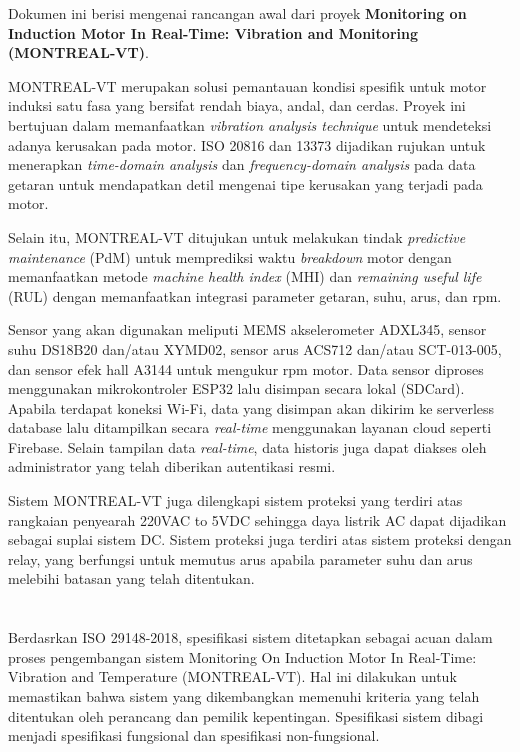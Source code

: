 \documentclass{elsinta}
\begin{document}
Dokumen ini berisi mengenai rancangan awal dari proyek
\textbf{Monitoring on Induction Motor In Real-Time: Vibration and Monitoring (MONTREAL-VT)}.

MONTREAL-VT merupakan solusi pemantauan kondisi
spesifik untuk motor induksi satu fasa yang bersifat
rendah biaya, andal, dan cerdas. Proyek ini bertujuan
dalam memanfaatkan \textit{vibration analysis technique}
untuk mendeteksi adanya kerusakan pada motor. ISO 20816
dan 13373 dijadikan rujukan untuk menerapkan
\textit{time-domain analysis} dan \textit{frequency-domain analysis}
pada data getaran untuk mendapatkan detil mengenai tipe kerusakan yang terjadi pada motor.

Selain itu, MONTREAL-VT ditujukan untuk melakukan tindak
\textit{predictive maintenance} (PdM) untuk memprediksi
waktu \textit{breakdown} motor dengan memanfaatkan metode
\textit{machine health index} (MHI) dan \textit{remaining useful life} (RUL)
dengan memanfaatkan integrasi parameter getaran, suhu, arus, dan rpm.

Sensor yang akan digunakan meliputi MEMS akselerometer ADXL345,
sensor suhu DS18B20 dan/atau XYMD02, sensor arus
ACS712 dan/atau SCT-013-005, dan sensor
efek hall A3144 untuk mengukur rpm motor. Data sensor
diproses menggunakan mikrokontroler ESP32 lalu disimpan
secara lokal (SDCard). Apabila terdapat koneksi
Wi-Fi, data yang disimpan akan dikirim ke serverless database
lalu ditampilkan secara \textit{real-time} 
menggunakan layanan cloud seperti Firebase.
Selain tampilan data \textit{real-time}, data historis juga dapat
diakses oleh administrator yang telah diberikan
autentikasi resmi.

Sistem MONTREAL-VT juga dilengkapi sistem proteksi yang terdiri atas
rangkaian penyearah 220VAC to 5VDC sehingga daya listrik
AC dapat dijadikan sebagai suplai sistem DC. Sistem proteksi
juga terdiri atas sistem proteksi dengan relay, yang berfungsi
untuk memutus arus apabila parameter suhu dan arus melebihi
batasan yang telah ditentukan.

\newpage

\section{\SystemSpecTitle}
Berdasrkan ISO 29148-2018\cite{BritishStandardsInstitution2016}, spesifikasi sistem ditetapkan sebagai acuan 
dalam proses pengembangan sistem Monitoring On Induction Motor In Real-Time:
Vibration and Temperature (MONTREAL-VT). Hal ini dilakukan 
untuk memastikan bahwa sistem yang dikembangkan memenuhi kriteria yang telah ditentukan
oleh perancang dan pemilik kepentingan. Spesifikasi sistem dibagi menjadi spesifikasi 
fungsional dan spesifikasi non-fungsional.
\end{document}
